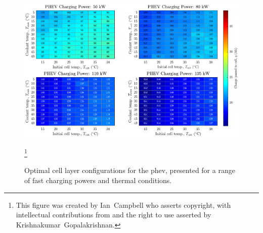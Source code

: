 \begin{figure}[!bp]
    \begin{minipage}[t]{\textwidth}
        \centering
        \includegraphics[width=\textwidth]{fig_generate_heatmap_PHEV}
        \caption[Optimal cell layer configurations for the \gls{phev}, presented for a range of
        fast charging powers and thermal conditions]{Optimal cell layer configurations for the \gls{phev}, presented for a range of
        fast charging powers and thermal conditions\footnotemark.}
        \label{fig:fig_generate_heatmap_PHEV}
        \mpfootnotes[1]
        \footnote{This figure was created by \mbox{Ian Campbell} who asserts copyright,
            with intellectual contributions from and the right to use asserted by
        \mbox{Krishnakumar Gopalakrishnan}.}
    \end{minipage}
\end{figure}





